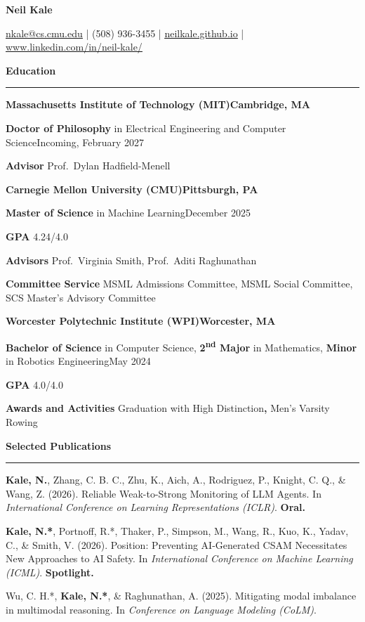 \documentclass[10pt,letterpaper]{article}
\newcommand{\cvsection}[1]{%
  \vspace{6.5pt}%
  {\bfseries #1}\par
  \vspace{1.2pt}\hrule\vspace{11.6pt}}
\newcommand{\lr}[2]{\noindent #1\hfill #2\par}
\newcommand{\entrygap}{\vspace{5.8pt}}
\newcommand{\wlink}[2]{\href{#1}{\uline{#2}}}
\newenvironment{pubgroup}[2][5.5pt]{%
  \vspace{#1}{\itshape #2}\par\vspace{0.5pt}%
  \fontsize{10}{12}\selectfont}{\par}
\newcommand{\pub}[2]{[#1] #2\par}
\begin{document}
\begin{center}
  {\fontsize{16}{18.3}\selectfont\bfseries Neil Kale}\par
  \vspace{2.8pt}
  \wlink{mailto:nkale@cs.cmu.edu}{nkale@cs.cmu.edu} | (508) 936-3455 |
  \wlink{https://neilkale.github.io}{neilkale.github.io} |
  \wlink{https://www.linkedin.com/in/neil-kale/}{www.linkedin.com/in/neil-kale/}
\end{center}
\vspace{-1pt}

\cvsection{Education}

\lr{\textbf{Massachusetts Institute of Technology (MIT)}}{\textbf{Cambridge, MA}}
\lr{\textbf{Doctor of Philosophy} in Electrical Engineering and Computer Science}{Incoming, February 2027}
\textbf{Advisor} Prof.\ Dylan Hadfield-Menell\par

\entrygap
\lr{\textbf{Carnegie Mellon University (CMU)}}{\textbf{Pittsburgh, PA}}
\lr{\textbf{Master of Science} in Machine Learning}{December 2025}
\textbf{GPA} 4.24/4.0\par
\textbf{Advisors} Prof.\ Virginia Smith, Prof.\ Aditi Raghunathan\par
\textbf{Committee Service} MSML Admissions Committee, MSML Social Committee, SCS Master's Advisory Committee\par

\entrygap
\lr{\textbf{Worcester Polytechnic Institute (WPI)}}{\textbf{Worcester, MA}}
\lr{\textbf{Bachelor of Science} in Computer Science, \textbf{2\textsuperscript{nd} Major} in Mathematics, \textbf{Minor} in Robotics Engineering}{May 2024}
\textbf{GPA} 4.0/4.0\par
\textbf{Awards and Activities} Graduation with High Distinction\textbf{,} Men's Varsity Rowing\par

\cvsection{Selected Publications}

\begin{pubgroup}[-4.7pt]{AI Safety and Oversight}
\pub{1}{\textbf{Kale, N.}, Zhang, C. B. C., Zhu, K., Aich, A., Rodriguez, P., Knight, C. Q., \& Wang, Z. (2026). Reliable Weak-to-Strong Monitoring of LLM Agents. In \textit{International Conference on Learning Representations (ICLR)}. \textbf{Oral.}}
\pub{2}{\textbf{Kale, N.*}, Portnoff, R.*, Thaker, P., Simpson, M., Wang, R., Kuo, K., Yadav, C., \& Smith, V. (2026). Position: Preventing AI-Generated CSAM Necessitates New Approaches to AI Safety. In \textit{International Conference on Machine Learning (ICML)}. \textbf{Spotlight.}}
\pub{3}{Wu, C. H.*, \textbf{Kale, N.*}, \& Raghunathan, A. (2025). Mitigating modal imbalance in multimodal reasoning. In \textit{Conference on Language Modeling (CoLM)}.}
\end{pubgroup}
\end{document}
